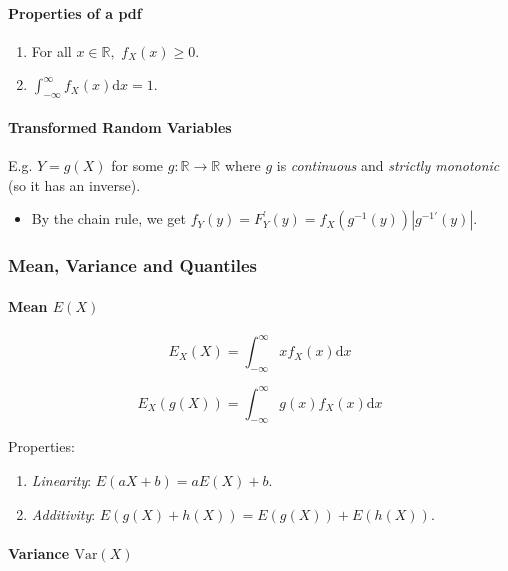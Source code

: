 \documentclass[twocolumn,english]{article}
\begin{document}
\paragraph{Properties of a pdf}
\begin{enumerate}
\item For all $x\in\mathbb{R},$ $f_{X}\left(x\right)\geq0$.
\item $\int_{-\infty}^{\infty}f_{X}\left(x\right)\text{d}x=1$.
\end{enumerate}

\paragraph{Transformed Random Variables}

E.g. $Y=g\left(X\right)$ for some $g:\mathbb{R}\rightarrow\mathbb{R}$
where $g$ is \emph{continuous} and \emph{strictly monotonic} (so
it has an inverse).
\begin{itemize}
\item By the chain rule, we get $f_{Y}\left(y\right)=F_{Y}^{\prime}\left(y\right)=f_{X}\left(g^{-1}\left(y\right)\right)\left|g^{-1'}\left(y\right)\right|$.
\end{itemize}

\subsubsection{Mean, Variance and Quantiles}

\paragraph{Mean $E\left(X\right)$}

\[
E_{X}\left(X\right)=\int_{-\infty}^{\infty}xf_{X}\left(x\right)\text{d}x
\]

\[
E_{X}\left(g\left(X\right)\right)=\int_{-\infty}^{\infty}g\left(x\right)f_{X}\left(x\right)\text{d}x
\]

Properties:
\begin{enumerate}
\item \emph{Linearity}: $E\left(aX+b\right)=aE\left(X\right)+b$.
\item \emph{Additivity}: $E\left(g\left(X\right)+h\left(X\right)\right)=E\left(g\left(X\right)\right)+E\left(h\left(X\right)\right)$.
\end{enumerate}

\paragraph{Variance $\text{Var}\left(X\right)$}
\end{document}
